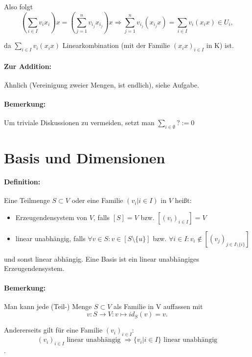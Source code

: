 	Also folgt
	\begin{equation*}
		(\sum_{i\in I}v_i x_i) x = (\sum_{j=1}^{n} v_{i_j}x_{i_j})x \Rightarrow \sum_{j=1}^{n} v_{i_j}(x_{i_j}x) = \sum_{i\in I} v_i(x_ix) \in U_i,
	\end{equation*}

	da $\sum_{i\in I} v_i(x_ix)$ Linearkombination (mit der Familie $(x_ix)_{i\in I}$ in K) ist.

\paragraph{Zur Addition:}
	Ähnlich (Vereinigung zweier Mengen, ist endlich), siehe Aufgabe.
\paragraph{Bemerkung:}
	Um triviale Diskussionen zu vermeiden, setzt man $\sum_{i\in \emptyset} ?:=0$

\section{Basis und Dimensionen}

\paragraph{Definition:}
	Eine Teilmenge $S\subset V$ oder eine Familie $(v_i| i\in I)$ in $ V $ heißt:
	\begin{itemize}
		\item Erzeugendensystem von $ V $, falls $[S] = V$ bzw. $[(v_i)_{i\in I}] = V$
		\item linear unabhängig, falls $\forall v\in S: v \in [S\setminus\{{u\}}]$ bzw. $\forall i\in I: v_i \notin [(v_j)_{j\in I\setminus\{{i\}}}]$
	\end{itemize}

	und sonst linear abhängig. Eine Basis ist ein linear unabhängiges Erzeugendensystem.

\paragraph{Bemerkung:}
	Man kann jede (Teil-) Menge $S\subset V$ als Familie in V auffassen mit
	\begin{equation*}
		v: S \to V: v\mapsto id_S(v) = v.
	\end{equation*}
	
	Andererseits gilt für eine Familie $(v_i)_{i\in I} $:
	\begin{equation*}
		(v_i)_{i\in I} \text{ linear unabhängig } \Rightarrow \{v_i| i\in I\} \text{ linear unabhängig}
	\end{equation*}.
	
